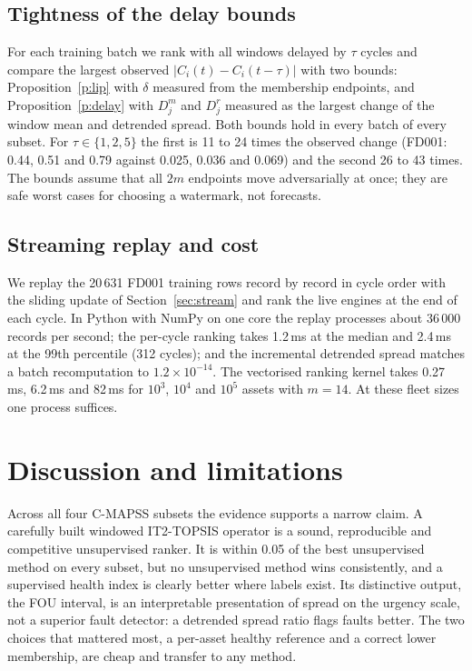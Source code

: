 \documentclass[journal,10pt,twocolumn]{IEEEtran}
\begin{document}
\subsection{Tightness of the delay bounds}
\label{sec:delay}
For each training batch we rank with all windows delayed by $\tau$ cycles and compare the largest observed $|C_i(t)-C_i(t-\tau)|$ with two bounds: Proposition~\ref{p:lip} with $\delta$ measured from the membership endpoints, and Proposition~\ref{p:delay} with $D^m_j$ and $D^r_j$ measured as the largest change of the window mean and detrended spread. Both bounds hold in every batch of every subset. For $\tau\in\{1,2,5\}$ the first is 11 to 24 times the observed change (FD001: 0.44, 0.51 and 0.79 against 0.025, 0.036 and 0.069) and the second 26 to 43 times. The bounds assume that all $2m$ endpoints move adversarially at once; they are safe worst cases for choosing a watermark, not forecasts.

\subsection{Streaming replay and cost}
We replay the 20\,631 FD001 training rows record by record in cycle order with the sliding update of Section~\ref{sec:stream} and rank the live engines at the end of each cycle. In Python with NumPy on one core the replay processes about 36\,000 records per second; the per-cycle ranking takes 1.2\,ms at the median and 2.4\,ms at the 99th percentile (312 cycles); and the incremental detrended spread matches a batch recomputation to $1.2\times10^{-14}$. The vectorised ranking kernel takes 0.27\,ms, 6.2\,ms and 82\,ms for $10^3$, $10^4$ and $10^5$ assets with $m=14$. At these fleet sizes one process suffices.

\section{Discussion and limitations}
Across all four C-MAPSS subsets the evidence supports a narrow claim. A carefully built windowed IT2-TOPSIS operator is a sound, reproducible and competitive unsupervised ranker. It is within 0.05 of the best unsupervised method on every subset, but no unsupervised method wins consistently, and a supervised health index is clearly better where labels exist. Its distinctive output, the FOU interval, is an interpretable presentation of spread on the urgency scale, not a superior fault detector: a detrended spread ratio flags faults better. The two choices that mattered most, a per-asset healthy reference and a correct lower membership, are cheap and transfer to any method.
\end{document}
